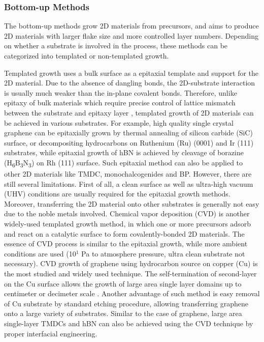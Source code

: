 \subsubsection{Bottom-up Methods}
\label{sec:bottom-up-methods}

The bottom-up methods grow 2D materials from precursors, and aims to
produce 2D materials with larger flake size and more controlled layer
numbers. Depending on whether a substrate is involved in the process,
these methods can be categorized into templated or non-templated
growth.

Templated growth uses a bulk surface as a epitaxial template and
support for the 2D material. Due to the absence of dangling bonds, the
2D-substrate interaction is usually much weaker than the in-plane
covalent bonds. Therefore, unlike epitaxy of bulk materials which
require precise control of lattice mismatch between the substrate and
epitaxy layer , templated growth of 2D
materials can be achieved in various substrates. For example, high
quality single crystal graphene can be epitaxially grown by thermal
annealing of silicon carbide (SiC) surface, or decompositing
hydrocarbons on Ruthenium (Ru) (0001) and Ir (111) substrates, while
epitaxial growth of hBN is achieved by cleavage of borazine
(H\textsubscript{6}B\textsubscript{3}N\textsubscript{3}) on Rh (111)
surface.  Such epitaxial method can also be applied to other 2D
materials like TMDC, monochalcogenides and BP. However, there are
still several limitations. First of all, a clean surface as well as
ultra-high vacuum (UHV) conditions are usually required for the
epitaxial growth methods. Moreover, transferring the 2D material onto
other substrates is generally not easy due to the noble metals
involved. Chemical vapor deposition (CVD) is another widely-used
templated growth method, in which one or more precursors adsorb and
react on a catalytic surface to form covalently-bonded 2D
materials. The essence of CVD process is similar to the epitaxial
growth, while more ambient conditions are used (10$^{1}$ Pa to
atmosphere pressure, ultra clean substrate not necessary). CVD growth
of graphene using hydrocarbon source on copper (Cu) is the most
studied and widely used technique. The self-termination of
second-layer on the Cu surface allows the growth of large area single
layer domains up to centimeter or decimeter scale . Another advantage of such method is easy
removal of Cu substrate by standard etching procedure, allowing
transferring graphene onto a large variety of
substrates.  Similar to the case of graphene, large
area single-layer TMDCs and hBN can also be achieved using the CVD technique by proper interfacial engineering. 
%

